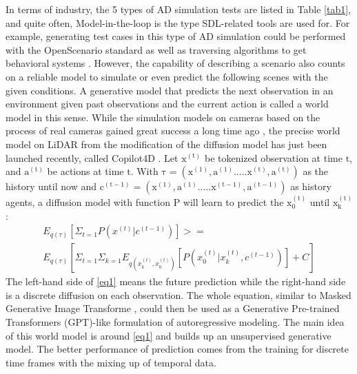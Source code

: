 \documentclass[conference]{IEEEtran}
\begin{document}
In terms of industry, the 5 types of AD simulation tests are listed in Table \ref{tab1}, and quite often, Model-in-the-loop is the type SDL-related tools are used for. For example, generating test cases in this type of AD simulation could be performed with the OpenScenario standard as well as traversing algorithms to get behavioral systems \cite{b4}. However, the capability of describing a scenario also counts on a reliable model to simulate or even predict the following scenes with the given conditions. A generative model that predicts the next observation in an environment given past observations and the current action is called a world model in this sense.  While the simulation models on cameras based on the process of real cameras gained great success a long time ago \cite{b12}, the precise world model on LiDAR from the modification of the diffusion model has just been launched recently, called Copilot4D \cite{b3}. Let $\mathrm {x^{(t)}}$ be tokenized observation at time $\mathrm{t}$, and $\mathrm {a^{(t)}}$ be actions at time $\mathrm{t}$. With $\mathrm{\tau=(x^{(1)},a^{(1)}.....x^{(t)},a^{(t)})}$ as the history until now and $\mathrm{c^{(t-1)}=(x^{(1)},a^{(1)}.....x^{(t-1)},a^{(t-1)})}$ as history agents, a diffusion model with function $\mathrm{P}$ will learn to predict the $\mathrm{x_{0}^{(t)}}$ until $\mathrm{x_{k}^{(t)}}$:
\begin{equation}
\begin{aligned}
E_{q(\tau)}[\Sigma_{t=1}P(x^{(t)}|c^{(t-1)})]>=\\
E_{q(\tau)}[\Sigma_{t=1}\Sigma_{k=1}E_{q(x_{k}^{(t)},x_{0}^{(t)})}[P(x_{0}^{(t)}| x_{k}^{(t)},c^{(t-1)})]+C]
\end{aligned}
\label{eq1}
\end{equation}
The left-hand side of \eqref{eq1} means the future prediction while the right-hand side is a discrete diffusion on each observation. The whole equation, similar to Masked Generative Image Transforme \cite{b13}, could then be used as a Generative Pre-trained Transformers (GPT)-like formulation of autoregressive modeling. The main idea of this world model is around \eqref{eq1} and builds up an unsupervised generative model. The better performance of prediction comes from the training for discrete time frames with the mixing up of temporal data.
\end{document}

